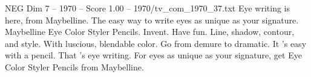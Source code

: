 \begin{textsample}{NEG Dim 7 – 1970 – Score 1.00 – 1970/tv\_com\_1970\_37.txt}  \label{ex:f7_neg_066}
Eye writing is here, from Maybelline.
The easy way to write eyes as unique as your signature.
Maybelline Eye Color Styler Pencils.
Invent.
Have fun.
Line, shadow, contour, and style.
With luscious, blendable color.
Go from demure to dramatic.
It 's easy with a pencil.
That 's eye writing.
For eyes as unique as your signature, get Eye Color Styler Pencils from Maybelline.

\end{textsample}
